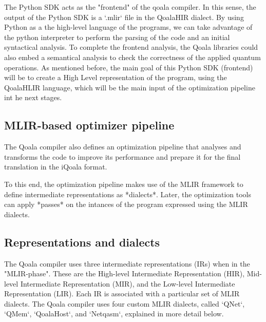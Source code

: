 
The Python SDK acts as the "frontend" of the qoala compiler. In this sense,
the output of the Python SDK is a `.mlir` file in the QoalaHIR dialect.
By using Python as a the high-level language of the programs, we can take advantage
of the python interpreter to perform the parsing of the code and an initial
syntactical analysis.
To complete the frontend analysis, the Qoala libraries could also embed a
semantical analysis to check the correctness of the applied quantum operations.
As mentioned before, the main goal of this Python SDK (frontend) will be to
create a High Level representation of the program, using the QoalaHLIR
language, which will be the main input of the optimization pipeline int he next stages.


\subsection{MLIR-based optimizer pipeline}
The Qoala compiler also defines an optimization pipeline that analyses and
transforms the code to improve its performance and prepare it for the final
translation in the iQoala format.

To this end, the optimization pipeline makes use of the MLIR framework to
define intermediate representations as *dialects*. Later, the optimization
tools can apply *passes* on the intances of the program expressed using the
MLIR dialects.


\subsection{Representations and dialects}
The Qoala compiler uses three intermediate representations (IRs) when in the "MLIR-phase".
These are the High-level Intermediate Representation (HIR), Mid-level Intermediate Representation (MIR), and the Low-level Intermediate Representation (LIR).
Each IR is associated with a particular set of MLIR dialects.
The Qoala compiler uses four custom MLIR dialects, called `QNet`, `QMem`, `QoalaHost`, and `Netqasm`, explained in more detail below.

